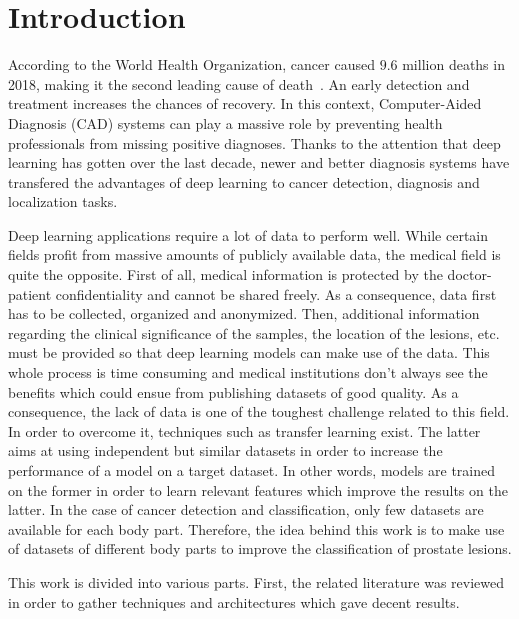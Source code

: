 
\chapter{Introduction}
\label{ch:introduction}


\setlength{\marginparwidth}{3cm}\leavevmode {}According to the World Health Organization, cancer caused $9.6$ million deaths in 2018, making it the second leading cause of death~\cite{44}. An early detection and treatment increases the chances of recovery. In this context, Computer-Aided Diagnosis (CAD) systems can play a massive role by preventing health professionals from missing positive diagnoses. Thanks to the attention that deep learning has gotten over the last decade, newer and better diagnosis systems have transfered the advantages of deep learning to cancer detection, diagnosis and localization tasks.

Deep learning applications require a lot of data to perform well. While certain fields profit from massive amounts of publicly available data, the medical field is quite the opposite. First of all, medical information is protected by the doctor-patient confidentiality and cannot be shared freely. As a consequence, data first has to be collected, organized and anonymized. Then, additional information regarding the clinical significance of the samples, the location of the lesions, etc. must be provided so that deep learning models can make use of the data. This whole process is time consuming and medical institutions don't always see the benefits which could ensue from publishing datasets of good quality. As a consequence, the lack of data is one of the toughest challenge related to this field. In order to overcome it, techniques such as transfer learning exist. The latter aims at using independent but similar datasets in order to increase the performance of a model on a target dataset. In other words, models are trained on the former in order to learn relevant features which improve the results on the latter. In the case of cancer detection and classification, only few datasets are available for each body part. Therefore, the idea behind this work is to make use of datasets of different body parts to improve the classification of prostate lesions.

This work is divided into various parts. First, the related literature was reviewed in order to gather techniques and architectures which gave decent results.

